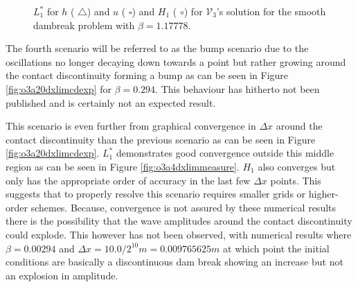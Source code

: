 \documentclass[SingleSpace,12pt,Journal]{Serre_ASCE}
\begin{document}
\begin{figure}
\centering
{}
\caption{$L^*_1$ for $h$ ({\color{red} $\triangle$}) and $u$ ({\color{blue} $\square$}) and $H_1$ ({\color{blue} $\circ$}) for $\mathcal{V}_3$'s solution for the smooth dambreak problem with $\beta = 1.17778$.}
\label{fig:o3a3dxlimmeasure}
\end{figure}


The fourth scenario will be referred to as the bump scenario due to the oscillations no longer decaying down towards a point but rather growing around the contact discontinuity forming a bump as can be seen in Figure \ref{fig:o3a20dxlimcdexp} for $\beta = 0.294$. This behaviour has hitherto not been published and is certainly not an expected result. 

This scenario is even further from graphical convergence in $\Delta x$ around the contact discontinuity than the previous scenario as can be seen in Figure \ref{fig:o3a20dxlimcdexp}. $L^*_1$ demonstrates good convergence outside this middle region as can be seen in Figure \ref{fig:o3a4dxlimmeasure}. $H_1$ also converges but only has the appropriate order of accuracy in the last few $\Delta x$ points. This suggests that to properly resolve this scenario requires smaller grids or higher-order schemes. Because, convergence is not assured by these numerical results there is the possibility that the wave amplitudes around the contact discontinuity could explode. This however has not been observed, with numerical results where $\beta = 0.00294$ and $\Delta x = 10.0/ 2^{10}m = 0.009765625m$ at which point the initial conditions are basically a discontinuous dam break showing an increase but not an explosion in amplitude.
\end{document}
